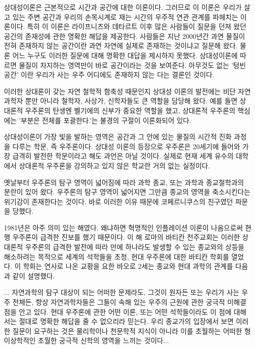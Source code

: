 상대성이론은 근본적으로 시간과
공간에 대한 이론이다. 그러므로 이 이론은 우리가 살고 있는 주변 공간과 우리의 손목시계로
재는 시간의 우주적 연관 관계를 파헤치는 이론이다. 특히 이 이론은 라이프니츠와 데타르트
이후 많은 사람들이 질문을 던져 왔던 공간의 존재성에 관한 명확한 해답을 제공한다.
사람들은 지난 2000년간 과연 물질이 전혀 존재하지 않는 공간이란 과연 자연에 실제로
존재하는 것이냐고 질문해 왔다. 물론 어느 누구도 이러한 질문에 대해 명확한 대답을
제시하지 못했다. 상대성이론에 따르면 물질이 차지하는 영역만이 바로 공간이라는 것을
보여준다. 아무것도 없는 '텅빈 공간' 이란 우리가 사는 우주 어디에도 존재하지 않는 다는
결론인 것이다.

이러한 상대론이 갖는 자연 철학적 함축성 때문인지 상대성 이론의 발전에는 비단 자연 과학자
뿐만 아니라 철학자, 사상가, 신학자들도 큰 역할을 담당해 왔다. 예를 들면 상대론적 우주론의
탄생엔 벨기에의 신부가 중요한 역할을 했고, 상대론적 우주론의 핵심에는 '부분은 전체를
포괄한다.'는 불경의 구절이 이론화되어 있다.

상대성이론이 가장 빛을 발하는 영역은 공간과 그 안에 있는 물질의 시간적 진화 과정을
다루는 학문, 즉 우주론이다. 상대성 이론의 등장으로 우주론은 20세기에 들어와 가장 급격히
발전한 학문이라고 해도 과언은 아닐 것이다. 실제로 현재 세계 유수의 대학에서 상대론적
우주론을 강의하고 있지 않은 학교란 거의 없는 실정이다.

옛날부터 우주론의 탐구 영역이
넓어짐에 따라 과학 종교, 또는 과학과 종교철학과의 분란이 있어 왔다. 우주론의 탐구 영역이
넓어지면 그만큼 종교의 영역을 축소시킨다는 위기감이 존재한다는 것이다. 바로 이러한 이유
때문에 코페르니쿠스의 친구였던 파문을 당했다.

1981년은 아주 의미 있는 해였다. 왜냐하면
혁명적인 인플레이션 이론이 나옴으로써 현행 우주론이 급격한 진보를 했기 때문이다. 이 해
로마의 바티칸 천주교회는 이러한 상대론적 우주론의 급격한 발전에 따라 만에 하나라도 발생할
수 있는 종교와의 상등을 해소하려는 목적으로 세계의 석학들을 초청, 현대  우주론에 대한
바티칸 학회를 열었다.
이 학회는 연사로 나온 교황을 요한 바오로 2세는 종교와 현대 과학의 관계를 다음과 같이
설명했다.

\beginemph
... 자연과학의 탐구 대상이 되는 어떠한 문제라도, 그것이 원자든 또는 우리가 사는 우주
전체든, 항상 자연과학자들은 그들이 속해 있는 우주의 근원에 관한 궁극적 미해결 점을 안고
있다. 현대 우주론에 관한 어떤 이론, 또는 어떤 석학들이라도 이 점에 대해서는 절대로 명확한
해답을 줄 수 없으리라 믿는다. 우리 종교가의 입장에서 보면 이러한 질문이 요구하는 것은
물리학이나 천문학적 지식이 아니라 이를 초월하는 어떠한 형이상학적인 초월한 궁극적 신학의
영역을 느끼는 것이다...
\endemph

